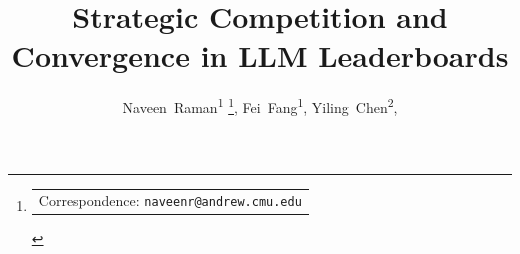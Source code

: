 \documentclass{article}
\title{Strategic Competition and Convergence in LLM Leaderboards}
\begin{document}
\author{
\mbox{Naveen Raman\textsuperscript{1}} \thanks{%
  \protect\begin{tabular}[t]{@{}l@{}}
    Correspondence: 
    \texttt{naveenr@andrew.cmu.edu}
  \end{tabular}%
},
\mbox{Fei Fang\textsuperscript{1}},
\mbox{Yiling Chen\textsuperscript{2}},
}

\newcommand{\affiliations}{
\mbox{\textsuperscript{1}\,\href{https://cmu.edu}{Carnegie Mellon University}}\quad
\mbox{\textsuperscript{2}\,\href{https://https://www.harvard.edu/}{Harvard University}}\quad
}

\makeatletter
\renewcommand{\@maketitle}{%
  {\centering
    {\bfseries\fontsize{18}{22}\selectfont \@title\par}
    \vspace{12pt}
    {\small
      \def\@makefnmark{\hbox{\@textsuperscript{\normalfont\@thefnmark}}}%
      \@author\par}
    \vspace{6pt}
    {\footnotesize\hypersetup{urlcolor=black}\affiliations\par}%
  }
}


\maketitle

\begin{abstract}
    
\end{abstract}












\newpage 




\newpage 

\appendix 





\end{document}
